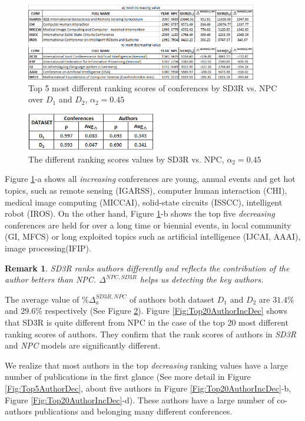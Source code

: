 \documentclass[10pt,leqno,twoside]{article}
\newtheorem{remark}{\indent Remark}[section]
\begin{document}
%
\begin{figure} %
	\caption{Top 5 most different ranking scores of conferences by SD3R vs. NPC over $D_1$ and $D_2$, $\alpha_2=0.45$}
	\label{Fig:Top5Inc}
    \centering
    \includegraphics[width=0.9\textwidth]{Top5cInc}
\end{figure}
%
%
\begin{figure} 
	\caption{The different ranking scores values by SD3R vs. NPC, $\alpha_2=0.45$}
	\label{Fig:DeltaRho}
    \centering
    \includegraphics[width=0.5\textwidth]{delta_rho}
\end{figure}
%
Figure \ref{Fig:Top5Inc}-a shows  all \textit{increasing} conferences are young, annual events and get hot topics, such as remote sensing (IGARSS), computer human interaction (CHI), medical image computing (MICCAI), solid-state circuits (ISSCC), intelligent robot (IROS). On the other hand, Figure \ref{Fig:Top5Inc}-b shows the top five \textit{decreasing} conferences are held for over a long time or biennial events, in local community (GI, MFCS) or long exploited topics such as artificial intelligence (IJCAI, AAAI), image processing(IFIP).
\begin{remark}
SD3R ranks authors differently and reflects the contribution of the author betters than NPC.
$\Delta^{NPC,SD3R}$ helps us  detecting the key authors.
\end{remark}
The average value of $\%\Delta^{SD3R, NPC}_a$ of authors both dataset $D_1$ and $D_2$ are $31.4\%$ and $29.6\%$ respectively
(See Figure \ref{Fig:DeltaRho}). Figure \ref{Fig:Top20AuthorIncDec} shows that SD3R is quite different from NPC in the case of the top 20 most different ranking scores of authors. They confirm that the rank scores of authors in \textit{SD3R} and \textit{NPC} models are  significantly different.

We realize that most authors in the top \textit{decreasing} ranking values have a large number of publications in the first glance (See more detail in Figure \ref{Fig:Top5AuthorDec}, about five authors in Figure \ref{Fig:Top20AuthorIncDec}-b, Figure \ref{Fig:Top20AuthorIncDec}-d). These authors have a large number of co-authors publications and belonging many different conferences.  
\end{document}
